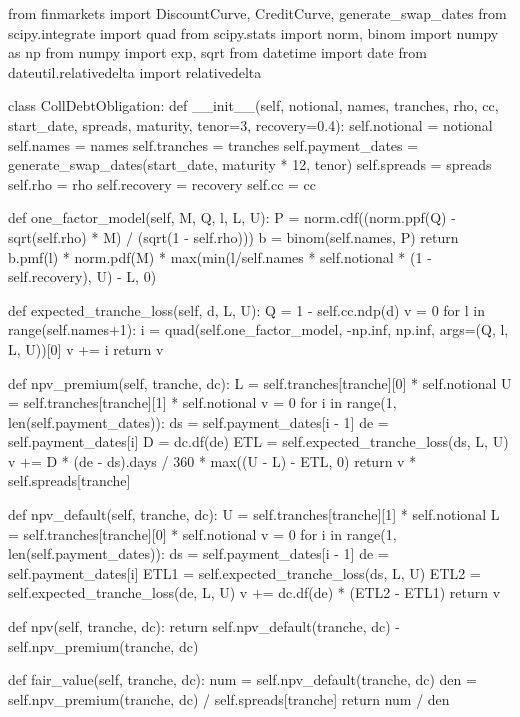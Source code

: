 \begin{ipython}
from finmarkets import DiscountCurve, CreditCurve, generate_swap_dates
from scipy.integrate import quad
from scipy.stats import norm, binom
import numpy as np
from numpy import exp, sqrt
from datetime import date
from dateutil.relativedelta import relativedelta

class CollDebtObligation:
    def __init__(self, notional, names, tranches, rho, cc,
                 start_date, spreads, maturity, tenor=3, recovery=0.4):
        self.notional = notional
        self.names = names
        self.tranches = tranches
        self.payment_dates = generate_swap_dates(start_date, maturity * 12, tenor)
        self.spreads = spreads
        self.rho = rho
        self.recovery = recovery
        self.cc = cc

    def one_factor_model(self, M, Q, l, L, U):
        P = norm.cdf((norm.ppf(Q) - sqrt(self.rho) * M) / (sqrt(1 - self.rho)))
        b = binom(self.names, P)
        return b.pmf(l) * norm.pdf(M) * max(min(l/self.names *
               self.notional * (1 - self.recovery), U) - L, 0)

    def expected_tranche_loss(self, d, L, U):
        Q = 1 - self.cc.ndp(d)
        v = 0 
        for l in range(self.names+1):
            i = quad(self.one_factor_model, -np.inf, np.inf,
                args=(Q, l, L, U))[0]
            v += i
        return v

    def npv_premium(self, tranche, dc):
        L = self.tranches[tranche][0] * self.notional
        U = self.tranches[tranche][1] * self.notional
        v = 0
        for i in range(1, len(self.payment_dates)):
            ds = self.payment_dates[i - 1]
            de = self.payment_dates[i]
            D = dc.df(de)
            ETL = self.expected_tranche_loss(ds, L, U)
            v += D * (de - ds).days / 360 * max((U - L) - ETL, 0)
        return v * self.spreads[tranche]

    def npv_default(self, tranche, dc):
        U = self.tranches[tranche][1] * self.notional
        L = self.tranches[tranche][0] * self.notional
        v = 0
        for i in range(1, len(self.payment_dates)):
            ds = self.payment_dates[i - 1]
            de = self.payment_dates[i]
            ETL1 = self.expected_tranche_loss(ds, L, U)
            ETL2 = self.expected_tranche_loss(de, L, U)
            v += dc.df(de) * (ETL2 - ETL1)
        return v

    def npv(self, tranche, dc):
        return self.npv_default(tranche, dc) - self.npv_premium(tranche, dc)

    def fair_value(self, tranche, dc):
        num = self.npv_default(tranche, dc)
        den = self.npv_premium(tranche, dc) / self.spreads[tranche]
        return num / den
\end{ipython}

